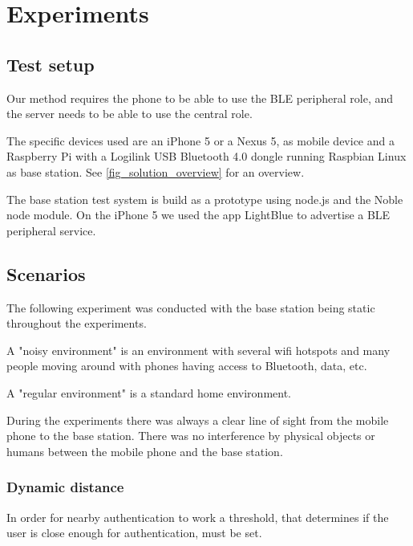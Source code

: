 \section{Experiments}

\subsection{Test setup}

Our method requires the phone to be able to use the BLE peripheral role, and the server needs to be able to use the central role.

The specific devices used are an iPhone 5 or a Nexus 5, as mobile device and a Raspberry Pi with a Logilink USB Bluetooth 4.0 dongle running Raspbian Linux\cite{ref:raspbian} as base station. See \cref{fig_solution_overview} for an overview.

The base station test system\cite{ref:Github} is build as a prototype using node.js\cite{ref:node} and the Noble node module.
On the iPhone 5 we used the app LightBlue\cite{ref:Lightblue} to advertise a BLE peripheral service.


\subsection{Scenarios}

The following experiment was conducted with the base station being static throughout the experiments.

A "noisy environment" is an environment with several wifi hotspots and many people moving around with phones having access to Bluetooth, data, etc.

A "regular environment" is a standard home environment.

During the experiments there was always a clear line of sight from the mobile phone to the base station. There was no interference by physical objects or humans between the mobile phone and the base station.


\subsubsection{Dynamic distance}
\label{section:MovingTowardsSystem}
In order for nearby authentication to work a threshold, that determines if the user is close enough for authentication, must be set.

